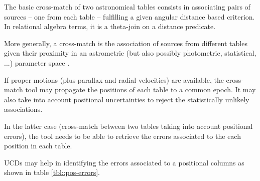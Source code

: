 The basic cross-match of two astronomical tables consists in associating pairs of sources -- one 
from each table -- fulfilling a given angular distance based criterion.
In relational algebra terms, it is a theta-join on a distance predicate.

More generally, a cross-match is the association of sources from different tables given their 
proximity in an astrometric (but also possibly photometric, statistical, ...) parameter space \citep{2017A&A...597A..89P} .

If proper motions (plus parallax and radial velocities) are available, the cross-match tool 
may propagate the positions of each table to a common epoch.
It may also take into account positional uncertainties to reject the statistically unlikely associations.

In the latter case (cross-match between two tables taking into account positional errors),
the tool needs to be able to retrieve the errors associated to the each position in each table.

UCDs may help in identifying the errors associated to a positional columns as shown in table \ref{tbl::pos-errors}.


